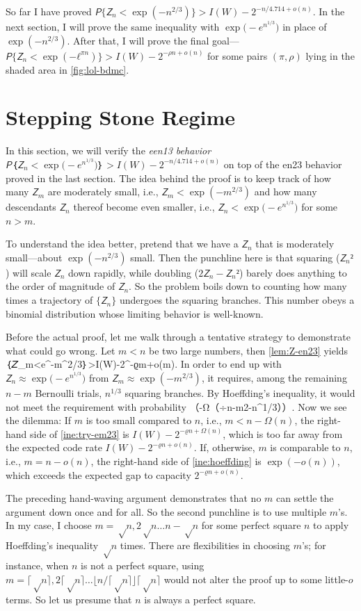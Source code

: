 \documentclass[openany]{amsbook}
\makeatletter
\numberwithin{equation}{chapter}
\numberwithin{figure}{chapter}
\numberwithin{table}{chapter}
\def\bigl@C#1{\bigl#1}					\def\bigr@C#1{\bigr#1}
\def\({\bigl@C(}	\def\){\bigr@C)}	令（{\Bigl(}			令）{\Bigr)}
\def\[#1\]{\begin{equation*}{#1}\end{equation*}}
\theoremstyle{definition}	理dfn:Definition~?s			理exa:Example~?s
\theoremstyle{remark}		理cla:Claim~?s				理rem:Remark~?s
\makeatother
\begin{document}
	So far I have proved $𝘗\{𝘡_n<\exp(-n^{2/3})\}>I(W)-2^{-n/4.714+o(n)}$.
	In the next section, I will prove the same inequality
	with $\exp\(-e^{n^{1/3}}\)$ in place of $\exp(-n^{2/3})$.
	After that, I will prove the final goal---$𝘗\{𝘡_n<\exp(-ℓ^{πn})\}>I(W)-2^{-ρn+o(n)}$
	for some pairs $(π,ρ)$ lying in the shaded area in \cref{fig:lol-bdmc}.

\section{Stepping Stone Regime}

	In this section, we will verify the \emph{een13 behavior}
	$𝘗｛𝘡_n<\exp\(-e^{n^{1/3}}\)｝>I(W)-2^{-n/4.714+o(n)}$
	on top of the en23 behavior proved in the last section.
	The idea behind the proof is to keep track of how many $𝘡_m$ are
	moderately small, i.e., $𝘡_m<\exp(-m^{2/3})$ and how many descendants $𝘡_n$
	thereof become even smaller, i.e., $𝘡_n<\exp\(-e^{n^{1/3}}\)$ for some $n>m$.
	
	To understand the idea better, pretend that we have a $𝘡_n$
	that is moderately small---about $\exp(-n^{2/3})$ small.
	Then the punchline here is that squaring ($𝘡_n²$)
	will scale $𝘡_n$ down rapidly, while doubling ($2𝘡_n-𝘡_n²$)
	barely does anything to the order of magnitude of $𝘡_n$.
	So the problem boils down to counting how many times
	a trajectory of $\{𝘡_n\}$ undergoes the squaring branches.
	This number obeys a binomial distribution whose limiting behavior is well-known.
	
	Before the actual proof, let me walk through
	a tentative strategy to demonstrate what could go wrong.
	Let $m<n$ be two large numbers, then \cref{lem:Z-en23} yields
	\[𝘗｛𝘡_m<e^{-m^{2/3}}｝>I(W)-2^{-ϱm+o(m)}.\label{ine:try-em23}\]
	In order to end up with $𝘡_n≈\exp\(-e^{n^{1/3}}\)$ from $𝘡_m≈\exp(-m^{2/3})$, it
	requires, among the remaining $n-m$ Bernoulli trials, $n^{1/3}$ squaring branches.
	By Hoeffding's inequality, it would not meet the requirement with probability
	\[\exp（-Ω（÷{n-m}2-n^{1/3}））.\label{ine:hoeffding}\]
	Now we see the dilemma:
	If $m$ is too small compared to $n$, i.e., $m<n-Ω(n)$,
	the right-hand side of \cref{ine:try-em23} is $I(W)-2^{-ϱn+Ω(n)}$,
	which is too far away from the expected code rate $I(W)-2^{-ϱn+o(n)}$.
	If, otherwise, $m$ is comparable to $n$, i.e., $m=n-o(n)$,
	the right-hand side of \cref{ine:hoeffding} is $\exp(-o(n))$,
	which exceeds the expected gap to capacity $2^{-ϱn+o(n)}$.
	
	The preceding hand-waving argument demonstrates that
	no $m$ can settle the argument down once and for all.
	So the second punchline is to use multiple $m$'s.
	In my case, I choose $m=√n,2√n…n-√n$ for some perfect square $n$
	to apply Hoeffding's inequality $√n$ times.
	There are flexibilities in choosing $m$'s;
	for instance, when $n$ is not a perfect square, using $m=⌈√n⌉,2⌈√n⌉…⌊n/⌈√n⌉⌋⌈√n⌉$
	would not alter the proof up to some little-$o$ terms.
	So let us presume that $n$ is always a perfect square.
	
\end{document}
